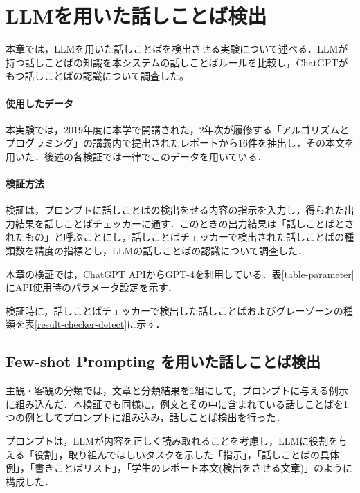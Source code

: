 \chapter{LLMを用いた話しことば検出 \label{c7}}

本章では，LLMを用いた話しことばを検出させる実験について述べる．LLMが持つ話しことばの知識を本システムの話しことばルールを比較し，ChatGPTがもつ話しことばの認識について調査した。

\subsubsection{使用したデータ}
本実験では，2019年度に本学で開講された，2年次が履修する「アルゴリズムとプログラミング」の講義内で提出されたレポートから16件を抽出し，その本文を用いた．後述の各検証では一律でこのデータを用いている．

\subsubsection{検証方法}
検証は，プロンプトに話しことばの検出をせる内容の指示を入力し，得られた出力結果を話しことばチェッカーに通す．このときの出力結果は「話しことばとされたもの」と呼ぶことにし，話しことばチェッカーで検出された話しことばの種類数を精度の指標とし，LLMの話しことばの認識について調査した．

本章の検証では，ChatGPT APIからGPT-4を利用している．表\ref{table-parameter}にAPI使用時のパラメータ設定を示す．

検証時に，話しことばチェッカーで検出した話しことばおよびグレーゾーンの種類を表\ref{result-checker-detect}に示す．




\section{Few-shot Prompting を用いた話しことば検出 \label{c7s1}}
主観・客観の分類では，文章と分類結果を1組にして，プロンプトに与える例示に組み込んだ．本検証でも同様に，例文とその中に含まれている話しことばを1つの例としてプロンプトに組み込み，話しことば検出を行った．



プロンプトは，LLMが内容を正しく読み取れることを考慮し，LLMに役割を与える「役割」，取り組んでほしいタスクを示した「指示」，「話しことばの具体例」，「書きことばリスト」，「学生のレポート本文(検出をさせる文章)」のように構成した．

